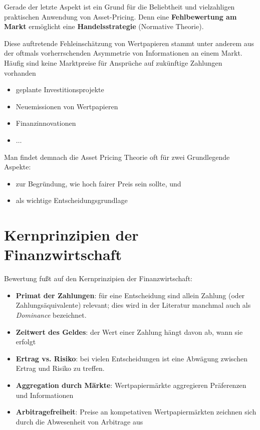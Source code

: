 \documentclass[12pt]{extreport} %
\theoremstyle{named}
\theoremstyle{nnamed}
\theoremstyle{itshape}
\theoremstyle{normal}
\begin{document}
Gerade der letzte Aspekt ist ein Grund für die Beliebtheit und vielzahligen praktischen Anwendung von Asset-Pricing. Denn eine \textbf{Fehlbewertung am Markt} ermöglicht eine \textbf{Handelsstrategie} (Normative Theorie). ~\bigskip

Diese auftretende Fehleinschätzung von Wertpapieren stammt unter anderem aus der oftmals vorherrschenden Asymmetrie von Informationen an einem Markt. Häufig sind keine Marktpreise für Ansprüche auf zukünftige Zahlungen vorhanden
\begin{itemize}
	\item geplante Investitionsprojekte
	\item Neuemissionen von Wertpapieren
	\item Finanzinnovationen
	\item $\dotsc$
\end{itemize}

Man findet demnach die Asset Pricing Theorie oft für zwei Grundlegende Aspekte:
\begin{itemize}
	\item zur Begründung, wie hoch fairer Preis sein sollte, und
	\item als wichtige Entscheidungsgrundlage
\end{itemize}

\section{Kernprinzipien der Finanzwirtschaft}
Bewertung fußt auf den Kernprinzipien der Finanzwirtschaft:
\begin{itemize}
	\item \textbf{Primat der Zahlungen}: für eine Entscheidung sind allein Zahlung (oder Zahlungsäquivalente) relevant; dies wird in der Literatur manchmal auch als \textit{Dominance} bezeichnet.
	\item \textbf{Zeitwert des Geldes}: der Wert einer Zahlung hängt davon ab, wann sie erfolgt
	\item \textbf{Ertrag vs. Risiko}: bei vielen Entscheidungen ist eine Abwägung zwischen Ertrag und Risiko zu treffen.
	\item \textbf{Aggregation durch Märkte}: Wertpapiermärkte aggregieren Präferenzen und Informationen
	\item \textbf{Arbitragefreiheit}: Preise an kompetativen Wertpapiermärkten zeichnen sich durch die Abwesenheit von Arbitrage aus
\end{itemize}
\end{document}
